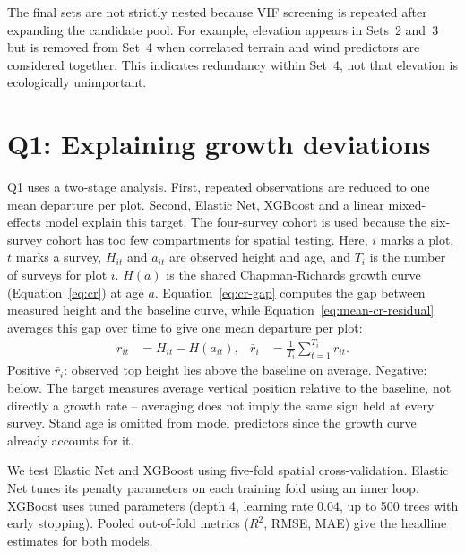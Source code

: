 The final sets are not strictly nested because VIF screening is repeated after expanding the candidate pool. For example, elevation appears in Sets~2 and~3 but is removed from Set~4 when correlated terrain and wind predictors are considered together. This indicates redundancy within Set~4, not that elevation is ecologically unimportant.

\section{Q1: Explaining growth deviations}
Q1 uses a two-stage analysis. First, repeated observations are reduced to one mean departure per plot. Second, Elastic Net, XGBoost and a linear mixed-effects model explain this target. The four-survey cohort is used because the six-survey cohort has too few compartments for spatial testing. Here, $i$ marks a plot, $t$ marks a survey, $H_{it}$ and $a_{it}$ are observed height and age, and $T_i$ is the number of surveys for plot $i$. $H(a)$ is the shared Chapman-Richards growth curve (Equation~\eqref{eq:cr}) at age $a$. Equation~\eqref{eq:cr-gap} computes the gap between measured height and the baseline curve, while Equation~\eqref{eq:mean-cr-residual} averages this gap over time to give one mean departure per plot:
\begin{align}
r_{it} &= H_{it} - H(a_{it}), \label{eq:cr-gap} &
\bar{r}_i &= \frac{1}{T_i} \sum_{t=1}^{T_i} r_{it}. \label{eq:mean-cr-residual}
\end{align}
Positive $\bar{r}_i$: observed top height lies above the baseline on average. Negative: below. The target measures average vertical position relative to the baseline, not directly a growth rate -- averaging does not imply the same sign held at every survey. Stand age is omitted from model predictors since the growth curve already accounts for it.

We test Elastic Net and XGBoost using five-fold spatial cross-validation. Elastic Net tunes its penalty parameters on each training fold using an inner loop. XGBoost uses tuned parameters (depth 4, learning rate 0.04, up to 500 trees with early stopping). Pooled out-of-fold metrics ($R^2$, RMSE, MAE) give the headline estimates for both models.

